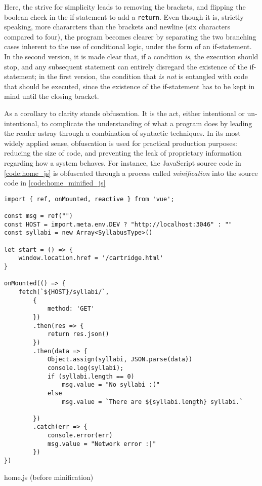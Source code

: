 Here, the strive for simplicity leads to removing the brackets, and flipping the boolean check in the if-statement to add a \lstinline{return}. Even though it is, strictly speaking, more chararcters than the brackets and newline (six characters compared to four), the program becomes clearer by separating the two branching cases inherent to the use of conditional logic, under the form of an if-statement. In the second version, it is made clear that, if a condition \emph{is}, the execution should stop, and any subsequent statement can entirely disregard the existence of the if-statement; in the first version, the condition that \emph{is not} is entangled with code that should be executed, since the existence of the if-statement has to be kept in mind until the closing bracket\cite{bush_15_2015}.

As a corollary to clarity stands obfuscation. It is the act, either intentional or un-intentional, to complicate the understanding of what a program does by leading the reader astray through a combination of syntactic techniques. In its most widely applied sense, obfuscation is used for practical production purposes: reducing the size of code, and preventing the leak of proprietary information regarding how a system behaves. For instance, the JavaScript source code in \ref{code:home_js} is obfuscated through a process called \emph{minification} into the source code in \ref{code:home_minified_js}

\begin{listing}
  \begin{verbatim}
import { ref, onMounted, reactive } from 'vue';

const msg = ref("")
const HOST = import.meta.env.DEV ? "http://localhost:3046" : ""
const syllabi = new Array<SyllabusType>()

let start = () => {
    window.location.href = '/cartridge.html'
}

onMounted(() => {
    fetch(`${HOST}/syllabi/`,
        {
            method: 'GET'
        })
        .then(res => {
            return res.json()
        })
        .then(data => {
            Object.assign(syllabi, JSON.parse(data))
            console.log(syllabi);
            if (syllabi.length == 0)
                msg.value = "No syllabi :("
            else
                msg.value = `There are ${syllabi.length} syllabi.`

        })
        .catch(err => {
            console.error(err)
            msg.value = "Network error :|"
        })
})
\end{verbatim}
  \caption{home.js (before minification)}
  \label{code:home_js}
\end{listing}

